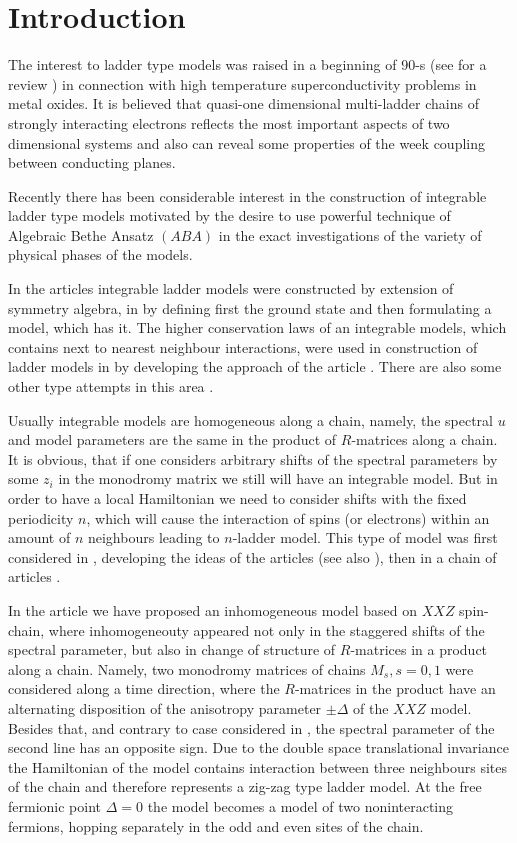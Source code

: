 \documentclass[a4paper,12pt]{article}
\begin{document}
\section{Introduction}
\indent

The interest to ladder type models was raised in a beginning of
90-s (see for a review \cite{Rice}) in connection with high
temperature superconductivity problems in metal oxides. It is
believed that quasi-one dimensional multi-ladder chains of
strongly interacting electrons reflects the most important
aspects of two dimensional systems and also can reveal some 
properties of the week coupling between conducting planes.

Recently there has been considerable interest in the construction
of integrable ladder type models motivated by the desire to use
powerful technique of Algebraic Bethe Ansatz $(ABA)$ \cite{Bax,FT} 
in the exact investigations of the variety of physical phases
of the models.

In the articles \cite{Wa} integrable ladder models were
constructed by extension of symmetry algebra, in \cite{Ko}
by defining first the ground state and then formulating a model,
which has it. The higher conservation laws of an integrable models,
which contains next to nearest neighbour interactions, were
used in construction of ladder models in \cite{Muu} by developing
the approach of the article \cite{Maj}. There are also some other 
type attempts in this area \cite{Al,For}.

Usually integrable models are homogeneous along a chain, namely,
the spectral $u$ and model parameters are the same in the
product of $R$-matrices along a chain. It is obvious, that if one 
considers arbitrary shifts of the spectral parameters by
some $z_i$ in the monodromy matrix we still will have an integrable
model. But in order to have a local Hamiltonian we need to consider
shifts with the fixed periodicity $n$, which will cause the
interaction of spins (or electrons) within an amount of $n$ neighbours
leading to $n$-ladder model. This type of model was first
considered in \cite{Destri}, developing the ideas
of the articles \cite{Resh} (see also \cite{FLec}), then in a
chain of articles \cite{ZV,ZV1, FR}.

In the article \cite{APSS} we have proposed an inhomogeneous model
based on $XXZ$ spin-chain, where inhomogeneouty appeared not
only in the staggered shifts of the spectral parameter, but
also in change of structure of $R$-matrices in a product along
a chain. Namely, two monodromy matrices of chains $M_s, s=0,1$ were
considered along a time direction, where the $R$-matrices in the 
product have an alternating disposition of the anisotropy
parameter $\pm \Delta$ of the $XXZ$ model.
Besides that, and contrary to case considered in \cite{FLec,ZV,ZV1,FR},
the spectral parameter of the second line has an opposite sign.
Due to the double space translational invariance the Hamiltonian of 
the model contains interaction between three neighbours sites
of the chain and  therefore represents a zig-zag type ladder
model. At the free fermionic point $\Delta = 0$ the model becomes
 a model of two noninteracting fermions, hopping separately
in the odd and even sites of the chain.
\end{document}
